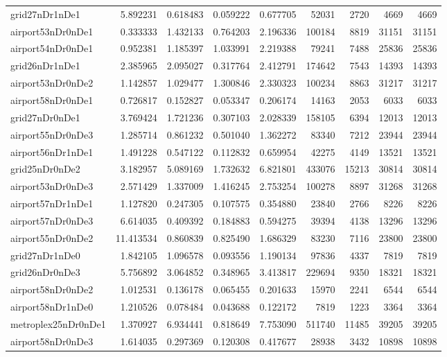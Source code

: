 \begin{longtable}{|l|r|r|r|r|r|r|r|r|}
grid27nDr1nDe1 & 5.892231 & 0.618483 & 0.059222 & 0.677705 & 52031 & 2720 & 4669 & 4669 \\
airport53nDr0nDe1 & 0.333333 & 1.432133 & 0.764203 & 2.196336 & 100184 & 8819 & 31151 & 31151 \\
airport54nDr0nDe1 & 0.952381 & 1.185397 & 1.033991 & 2.219388 & 79241 & 7488 & 25836 & 25836 \\
grid26nDr1nDe1 & 2.385965 & 2.095027 & 0.317764 & 2.412791 & 174642 & 7543 & 14393 & 14393 \\
airport53nDr0nDe2 & 1.142857 & 1.029477 & 1.300846 & 2.330323 & 100234 & 8863 & 31217 & 31217 \\
airport58nDr0nDe1 & 0.726817 & 0.152827 & 0.053347 & 0.206174 & 14163 & 2053 & 6033 & 6033 \\
grid27nDr0nDe1 & 3.769424 & 1.721236 & 0.307103 & 2.028339 & 158105 & 6394 & 12013 & 12013 \\
airport55nDr0nDe3 & 1.285714 & 0.861232 & 0.501040 & 1.362272 & 83340 & 7212 & 23944 & 23944 \\
airport56nDr1nDe1 & 1.491228 & 0.547122 & 0.112832 & 0.659954 & 42275 & 4149 & 13521 & 13521 \\
grid25nDr0nDe2 & 3.182957 & 5.089169 & 1.732632 & 6.821801 & 433076 & 15213 & 30814 & 30814 \\
airport53nDr0nDe3 & 2.571429 & 1.337009 & 1.416245 & 2.753254 & 100278 & 8897 & 31268 & 31268 \\
airport57nDr1nDe1 & 1.127820 & 0.247305 & 0.107575 & 0.354880 & 23840 & 2766 & 8226 & 8226 \\
airport57nDr0nDe3 & 6.614035 & 0.409392 & 0.184883 & 0.594275 & 39394 & 4138 & 13296 & 13296 \\
airport55nDr0nDe2 & 11.413534 & 0.860839 & 0.825490 & 1.686329 & 83230 & 7116 & 23800 & 23800 \\
grid27nDr1nDe0 & 1.842105 & 1.096578 & 0.093556 & 1.190134 & 97836 & 4337 & 7819 & 7819 \\
grid26nDr0nDe3 & 5.756892 & 3.064852 & 0.348965 & 3.413817 & 229694 & 9350 & 18321 & 18321 \\
airport58nDr0nDe2 & 1.012531 & 0.136178 & 0.065455 & 0.201633 & 15970 & 2241 & 6544 & 6544 \\
airport58nDr1nDe0 & 1.210526 & 0.078484 & 0.043688 & 0.122172 & 7819 & 1223 & 3364 & 3364 \\
metroplex25nDr0nDe1 & 1.370927 & 6.934441 & 0.818649 & 7.753090 & 511740 & 11485 & 39205 & 39205 \\
airport58nDr0nDe3 & 1.614035 & 0.297369 & 0.120308 & 0.417677 & 28938 & 3432 & 10898 & 10898 \\

\end{longtable}
